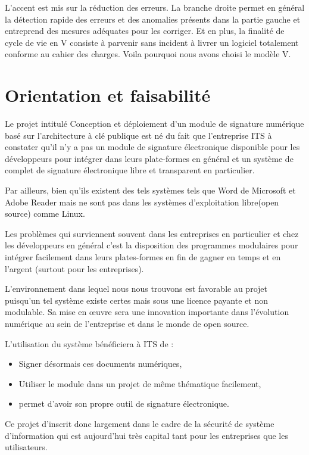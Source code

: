 			L'accent est mis sur la réduction des erreurs. La branche droite permet en général la détection rapide des erreurs et des anomalies présents dans la partie gauche et entreprend des mesures adéquates pour les corriger. Et en plus, la finalité de cycle de vie en V consiste à parvenir sans incident à livrer un logiciel totalement conforme au cahier des charges\cite{kolyang}. Voila pourquoi nous avons choisi le modèle V.
			
	\section{Orientation et faisabilité}
		Le projet intitulé  \og Conception et déploiement d'un module de signature numérique basé sur l'architecture à clé  publique \fg  est né  du fait que l'entreprise ITS à constater qu'il n'y a pas un module de signature électronique disponible pour les développeurs pour intégrer dans leurs plate-formes en général et un système de complet de signature électronique libre et transparent en particulier.
		
		Par ailleurs, bien qu'ils existent des tels  systèmes tels que  Word de Microsoft et Adobe Reader mais ne sont pas dans les systèmes d’exploitation libre(open source) comme Linux.
		
	Les problèmes qui surviennent souvent dans les entreprises en particulier et chez les développeurs en général c’est la disposition des programmes modulaires pour intégrer facilement dans leurs plates-formes en fin de gagner en temps et en l’argent (surtout pour les entreprises).
	
	L’environnement dans lequel nous nous trouvons est favorable au projet puisqu’un tel système existe certes mais sous une licence payante et non modulable. Sa mise en œuvre sera une innovation importante dans l’évolution numérique au sein de l’entreprise et dans le monde de open source.
	
	L'utilisation du système bénéficiera à ITS de :
	\begin{itemize}
		\item Signer désormais ces documents numériques,
		\item Utiliser le module dans un projet de même thématique facilement,
		\item permet d'avoir son propre outil de signature électronique.\\
	\end{itemize}

Ce projet d'inscrit donc largement dans le cadre de la sécurité de système d'information qui est aujourd’hui très capital tant pour les entreprises que les utilisateurs. 



